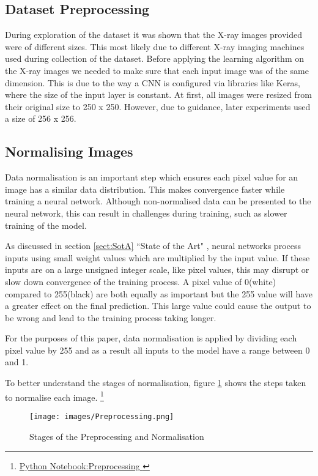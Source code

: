 \subsection{Dataset Preprocessing}

During exploration of the dataset it was shown that the X-ray images provided were of different sizes. This most likely due to different X-ray imaging machines used during collection of the dataset. Before applying the learning algorithm on the X-ray images we needed to make sure that each input image was of the same dimension. This is due to the way a CNN is configured via libraries like Keras, where the size of the input layer is constant. At first, all images were resized from their original size to 250 x 250. However, due to guidance, later experiments used a size of 256 x 256. 



\subsection{Normalising Images}

Data normalisation is an important step which ensures each pixel value for an image has a similar data distribution. This makes convergence faster while training a neural network. Although non-normalised data can be presented to the neural network, this can result in challenges during training, such as slower training of the model. 

As discussed in section \ref{sect:SotA}  ``State of the Art" , neural networks process inputs using small weight values which are multiplied by the input value. If these inputs are on a large unsigned integer scale, like pixel values, this may disrupt or slow down convergence of the training process. A pixel value of 0(white) compared to 255(black) are both equally as important but the 255 value will have a greater effect on the final prediction. This large value could cause the output to be wrong and lead to the training process taking longer. 

For the purposes of this paper, data normalisation is applied by dividing each pixel value by 255 and as a result all inputs to the model have a range between 0 and 1.

To better understand the stages of normalisation, figure \ref{fig:preprocessing} shows the steps taken to normalise each image.
\footnote[1]{\href{https://github.com/jozi98/HonoursProject/blob/master/ChestX-ray.ipynb}{Python Notebook:Preprocessing }} 

 \begin{figure}[H]
	\centering
	\texttt{[image: images/Preprocessing.png]}
	\caption{Stages of the Preprocessing and Normalisation}
	\label{fig:preprocessing}
\end{figure}


 
